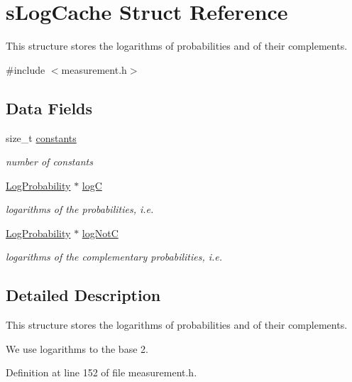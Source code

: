 \hypertarget{structsLogCache}{\section{s\-Log\-Cache \-Struct \-Reference}
\label{structsLogCache}
}


\-This structure stores the logarithms of probabilities and of their complements.  




{\ttfamily \#include $<$measurement.\-h$>$}

\subsection*{\-Data \-Fields}
\begin{DoxyCompactItemize}
\item 
size\-\_\-t \hyperlink{structsLogCache_a06855ad644ec7343d2952cb079d83cd1}{constants}
\begin{DoxyCompactList}\small\item\em number of constants \end{DoxyCompactList}\item 
\hyperlink{common_2measurement_8h_a0a02860cc83aa9ce63d00855bc9058e0}{\-Log\-Probability} $\ast$ \hyperlink{structsLogCache_ac1a2fe56f678e4b2be3b56f9b6c04163}{log\-C}
\begin{DoxyCompactList}\small\item\em logarithms of the probabilities, i.\-e. \end{DoxyCompactList}\item 
\hyperlink{common_2measurement_8h_a0a02860cc83aa9ce63d00855bc9058e0}{\-Log\-Probability} $\ast$ \hyperlink{structsLogCache_aa9bfdee3aa5ff16f6ef8e3bef6da8f9c}{log\-Not\-C}
\begin{DoxyCompactList}\small\item\em logarithms of the complementary probabilities, i.\-e. \end{DoxyCompactList}\end{DoxyCompactItemize}


\subsection{\-Detailed \-Description}
\-This structure stores the logarithms of probabilities and of their complements. 

\-We use logarithms to the base 2. 

\-Definition at line 152 of file measurement.\-h.



